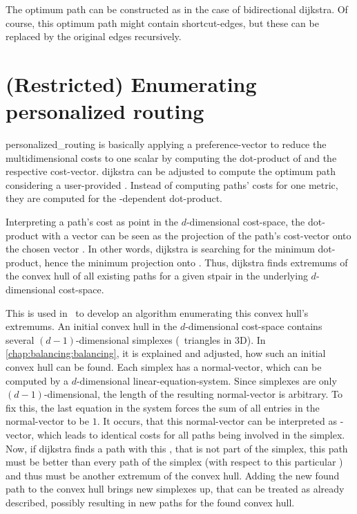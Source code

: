     The optimum path can be constructed as in the case of bidirectional \gls{dijkstra}.
    Of course, this optimum path might contain shortcut-edges, but these can be replaced by the original edges recursively.

\section{(Restricted) Enumerating personalized routing}

    \Gls{personalized_routing} is basically applying a preference-vector \alpha to reduce the multidimensional costs to one scalar by computing the dot-product of \alpha and the respective cost-vector.
    \Gls{dijkstra} can be adjusted to compute the optimum path considering a user-provided \alpha.
    Instead of computing paths' costs for one \gls{metric}, they are computed for the \alpha-dependent dot-product.

    Interpreting a path's cost as point in the $d$-dimensional cost-space, the dot-product with a vector \alpha can be seen as the projection of the path's cost-vector onto the chosen vector \alpha.
    In other words, \gls{dijkstra} is searching for the minimum dot-product, hence the minimum projection onto \alpha.
    Thus, \gls{dijkstra} finds extremums of the convex hull of all existing paths for a given \gls{stpair} in the underlying $d$-dimensional cost-space.

    This is used in~\cite{barth:alternative_multicriteria_routes} to develop an algorithm enumerating this convex hull's extremums.
    An initial convex hull in the $d$-dimensional cost-space contains several $(d-1)$-dimensional simplexes (\eg\ triangles in 3D).
    In \cref{chap:balancing:balancing}, it is explained and adjusted, how such an initial convex hull can be found.
    Each simplex has a normal-vector, which can be computed by a $d$-dimensional linear-equation-system.
    Since simplexes are only $(d-1)$-dimensional, the length of the resulting normal-vector is arbitrary.
    To fix this, the last equation in the system forces the sum of all entries in the normal-vector to be $1$.
    It occurs, that this normal-vector can be interpreted as \alpha-vector, which leads to identical costs for all paths being involved in the simplex.
    Now, if \gls{dijkstra} finds a path with this \alpha, that is not part of the simplex, this path must be better than every path of the simplex (with respect to this particular \alpha) and thus must be another extremum of the convex hull.
    Adding the new found path to the convex hull brings new simplexes up, that can be treated as already described, possibly resulting in new paths for the found convex hull.


